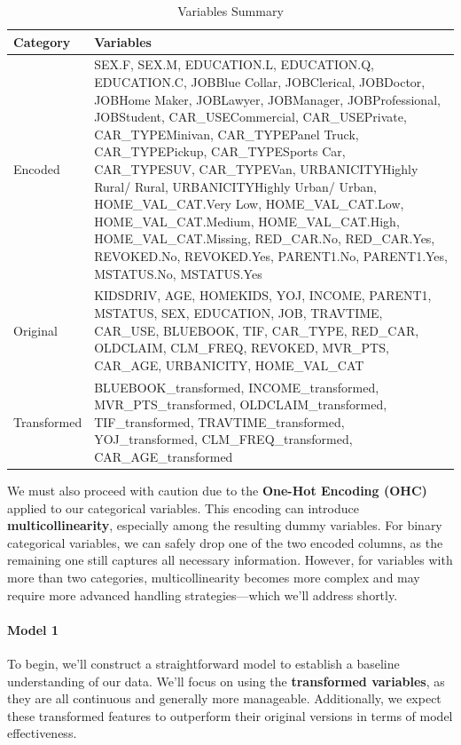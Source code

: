 \documentclass[
]{article}
\begin{document}
\begin{table}[H]
\centering\centering
\caption{\label{tab:unnamed-chunk-8}Variables Summary}
\centering
\begin{tabular}[t]{l|l}
\hline
Category & Variables\\
\hline
Encoded & SEX.F, SEX.M, EDUCATION.L, EDUCATION.Q, EDUCATION.C, JOBBlue Collar, JOBClerical, JOBDoctor, JOBHome Maker, JOBLawyer, JOBManager, JOBProfessional, JOBStudent, CAR\_USECommercial, CAR\_USEPrivate, CAR\_TYPEMinivan, CAR\_TYPEPanel Truck, CAR\_TYPEPickup, CAR\_TYPESports Car, CAR\_TYPESUV, CAR\_TYPEVan, URBANICITYHighly Rural/ Rural, URBANICITYHighly Urban/ Urban, HOME\_VAL\_CAT.Very Low, HOME\_VAL\_CAT.Low, HOME\_VAL\_CAT.Medium, HOME\_VAL\_CAT.High, HOME\_VAL\_CAT.Missing, RED\_CAR.No, RED\_CAR.Yes, REVOKED.No, REVOKED.Yes, PARENT1.No, PARENT1.Yes, MSTATUS.No, MSTATUS.Yes\\
\hline
Original & KIDSDRIV, AGE, HOMEKIDS, YOJ, INCOME, PARENT1, MSTATUS, SEX, EDUCATION, JOB, TRAVTIME, CAR\_USE, BLUEBOOK, TIF, CAR\_TYPE, RED\_CAR, OLDCLAIM, CLM\_FREQ, REVOKED, MVR\_PTS, CAR\_AGE, URBANICITY, HOME\_VAL\_CAT\\
\hline
Transformed & BLUEBOOK\_transformed, INCOME\_transformed, MVR\_PTS\_transformed, OLDCLAIM\_transformed, TIF\_transformed, TRAVTIME\_transformed, YOJ\_transformed, CLM\_FREQ\_transformed, CAR\_AGE\_transformed\\
\hline
\end{tabular}
\end{table}

We must also proceed with caution due to the \textbf{One-Hot Encoding
(OHC)} applied to our categorical variables. This encoding can introduce
\textbf{multicollinearity}, especially among the resulting dummy
variables. For binary categorical variables, we can safely drop one of
the two encoded columns, as the remaining one still captures all
necessary information. However, for variables with more than two
categories, multicollinearity becomes more complex and may require more
advanced handling strategies---which we'll address shortly.

\paragraph{Model 1}\label{model-1}

To begin, we'll construct a straightforward model to establish a
baseline understanding of our data. We'll focus on using the
\textbf{transformed variables}, as they are all continuous and generally
more manageable. Additionally, we expect these transformed features to
outperform their original versions in terms of model effectiveness.
\end{document}

